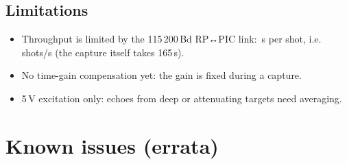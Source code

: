 \documentclass[10pt,a4paper]{article}
\newcommand{\us}{\,\textmu s}
\begin{document}
\subsection{Limitations}
\begin{itemize}
  \item Throughput is limited by the 115\,200\,Bd RP↔PIC link: \vpetime\,s per shot, i.e. \vprf\,shots/s (the capture itself takes 165\us).
  \item No time-gain compensation yet: the gain is fixed during a capture.
  \item 5\,V excitation only: echoes from deep or attenuating targets need averaging.
\end{itemize}

\section{Known issues (errata)}
\small
\end{document}
